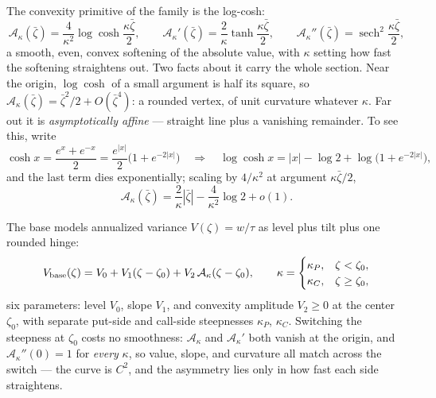 The convexity primitive of the family is the log-cosh:
\begin{equation}
\mathcal{A}_\kappa(\bar\zeta)=\frac{4}{\kappa^2}\log\cosh\frac{\kappa\bar\zeta}{2},
\qquad
\mathcal{A}_\kappa'(\bar\zeta)=\frac{2}{\kappa}\tanh\frac{\kappa\bar\zeta}{2},
\qquad
\mathcal{A}_\kappa''(\bar\zeta)=\operatorname{sech}^2\frac{\kappa\bar\zeta}{2},
\label{eq:acosh}
\end{equation}
a smooth, even, convex softening of the absolute value, with $\kappa$
setting how fast the softening straightens out.  Two facts about it
carry the whole section.  Near the origin, $\log\cosh$ of a small
argument is half its square, so
$\mathcal{A}_\kappa(\bar\zeta)=\bar\zeta^2/2+O(\bar\zeta^4)$: a rounded
vertex, of unit curvature whatever $\kappa$.  Far out it is
\emph{asymptotically affine} --- straight line plus a vanishing
remainder.  To see this, write
\[
\cosh x=\frac{e^{x}+e^{-x}}{2}=\frac{e^{|x|}}{2}\big(1+e^{-2|x|}\big)
\quad\Longrightarrow\quad
\log\cosh x=|x|-\log2+\log\!\big(1+e^{-2|x|}\big),
\]
and the last term dies exponentially; scaling by $4/\kappa^2$ at
argument $\kappa\bar\zeta/2$,
\begin{equation}
\mathcal{A}_\kappa(\bar\zeta)=\frac{2}{\kappa}|\bar\zeta|
-\frac{4}{\kappa^2}\log2+o(1).
\label{eq:affine}
\end{equation}

The base models annualized variance $V(\zeta)=w/\tau$ as level plus
tilt plus one rounded hinge:
\begin{equation}
V_{\rm base}(\zeta)=V_0+V_1(\zeta-\zeta_0)
+V_2\,\mathcal{A}_{\kappa}(\zeta-\zeta_0),
\qquad
\kappa=\begin{cases}\kappa_P,&\zeta<\zeta_0,\\
\kappa_C,&\zeta\ge\zeta_0,\end{cases}
\label{eq:mcsbase}
\end{equation}
six parameters: level $V_0$, slope $V_1$, and convexity amplitude
$V_2\ge0$ at the center $\zeta_0$, with separate put-side and call-side
steepnesses $\kappa_P$, $\kappa_C$.  Switching the steepness at
$\zeta_0$ costs no smoothness: $\mathcal{A}_\kappa$ and
$\mathcal{A}_\kappa'$ both vanish at the origin, and
$\mathcal{A}_\kappa''(0)=1$ for \emph{every} $\kappa$, so value, slope,
and curvature all match across the switch --- the curve is $C^2$, and
the asymmetry lies only in how fast each side straightens.

